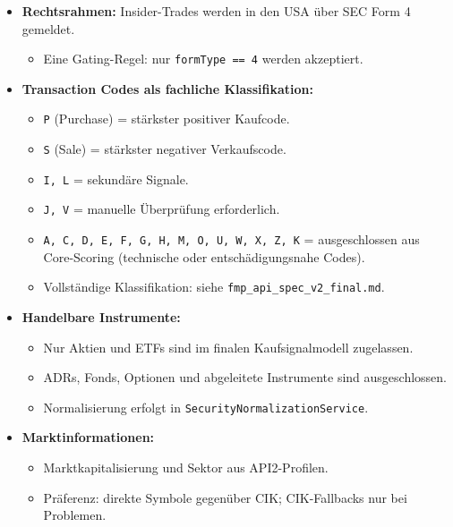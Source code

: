 \begin{itemize}
  \item \textbf{Rechtsrahmen:} Insider-Trades werden in den USA über SEC Form 4 gemeldet. %
    \begin{itemize}
      \item Eine Gating-Regel: nur \texttt{formType == 4} werden akzeptiert. %
    \end{itemize}
  \item \textbf{Transaction Codes als fachliche Klassifikation:}
    \begin{itemize}
      \item \texttt{P} (Purchase) = stärkster positiver Kaufcode. %
      \item \texttt{S} (Sale) = stärkster negativer Verkaufscode. %
      \item \texttt{I, L} = sekundäre Signale. %
      \item \texttt{J, V} = manuelle Überprüfung erforderlich. %
      \item \texttt{A, C, D, E, F, G, H, M, O, U, W, X, Z, K} = ausgeschlossen aus Core-Scoring (technische oder entschädigungsnahe Codes). %
      \item Vollständige Klassifikation: siehe \texttt{fmp\_api\_spec\_v2\_final.md}. %
    \end{itemize}
  \item \textbf{Handelbare Instrumente:}
    \begin{itemize}
      \item Nur Aktien und ETFs sind im finalen Kaufsignalmodell zugelassen. %
      \item ADRs, Fonds, Optionen und abgeleitete Instrumente sind ausgeschlossen. %
      \item Normalisierung erfolgt in \texttt{SecurityNormalizationService}. %
    \end{itemize}
  \item \textbf{Marktinformationen:}
    \begin{itemize}
      \item Marktkapitalisierung und Sektor aus API2-Profilen.
      \item Präferenz: direkte Symbole gegenüber CIK; CIK-Fallbacks nur bei Problemen.
    \end{itemize}
\end{itemize}

